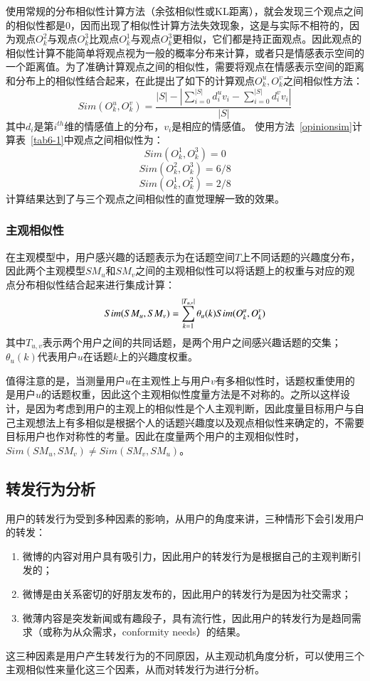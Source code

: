 使用常规的分布相似性计算方法（余弦相似性或KL距离），就会发现三个观点之间的相似性都是0，因而出现了相似性计算方法失效现象，这是与实际不相符的，因为观点$ O_{k}^{2} $与观点$ O_{k}^{3} $比观点$ O_{k}^{1} $与观点$ O_{k}^{3} $更相似，它们都是持正面观点。因此观点的相似性计算不能简单将观点视为一般的概率分布来计算，或者只是情感表示空间的一个距离值。为了准确计算观点之间的相似性，需要将观点在情感表示空间的距离和分布上的相似性结合起来，在此提出了如下的计算观点$O_{k}^{u},O_{k}^{v} $之间相似性方法：
\begin{equation}
\label{opinionsim}
Sim(O_{k}^{u},O_{k}^{v})=\dfrac{|S|-|\sum_{i=0}^{|S|}d_{i}^{u}v_{i}-\sum_{i=0}^{|S|}d_{i}^{v}v_{i}|}{|S|}
\end{equation}
其中$ d_{i} $是第$ i^{th} $维的情感值上的分布，$ v_{i} $是相应的情感值。
使用方法~\ref{opinionsim}计算表~\ref{tab6-1}中观点之间相似性为：
$$ Sim(O_{k}^{1},O_{k}^{3})=0 $$ 
$$Sim(O_{k}^{2},O_{k}^{3})=6/8$$
$$ Sim(O_{k}^{1},O_{k}^{2})=2/8 $$
计算结果达到了与三个观点之间相似性的直觉理解一致的效果。

\subsubsection{主观相似性}
在主观模型中，用户感兴趣的话题表示为在话题空间$ T $上不同话题的兴趣度分布，因此两个主观模型$SM_u$和$SM_v$之间的主观相似性可以将话题上的权重与对应的观点分布相似性结合起来进行集成计算：
\begin{equation}
\label{subsim}
Sim(SM_{u},SM_{v})=\sum_{k=1}^{|T_{u,v}|}\theta_{u}(k)\* Sim(O_{k}^{u},O_{k}^{v})
\end{equation}
其中$ T_{u,v} $表示两个用户之间的共同话题，是两个用户之间感兴趣话题的交集；$ \theta_{u}(k) $代表用户$ u $在话题$ k $上的兴趣度权重。

值得注意的是，当测量用户$ u $在主观性上与用户$ v $有多相似性时，话题权重使用的是用户$ u $的话题权重，因此这个主观相似性度量方法是不对称的。之所以这样设计，是因为考虑到用户的主观上的相似性是个人主观判断，因此度量目标用户与自己主观想法上有多相似是根据个人的话题兴趣度以及观点相似性来确定的，不需要目标用户也作对称性的考量。因此在度量两个用户的主观相似性时，$ Sim(SM_u,SM_v)\neq Sim(SM_v,SM_u)$。

\subsection{转发行为分析}
\label{retweet}
用户的转发行为受到多种因素的影响，从用户的角度来讲，三种情形下会引发用户的转发：
\begin{enumerate}
\item 微博的内容对用户具有吸引力，因此用户的转发行为是根据自己的主观判断引发的；
\item 微博是由关系密切的好朋友发布的，因此用户的转发行为是因为社交需求；
\item 微薄内容是突发新闻或有趣段子，具有流行性，因此用户的转发行为是趋同需求（或称为从众需求，conformity needs）的结果。
\end{enumerate}
这三种因素是用户产生转发行为的不同原因，从主观动机角度分析，可以使用三个主观相似性来量化这三个因素，从而对转发行为进行分析。


